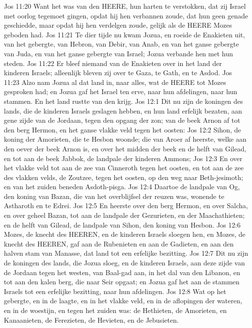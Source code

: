 Jos 11:20  Want het was van den HEERE, hun harten te verstokken, dat zij Israel met oorlog tegemoet gingen, opdat hij hen verbannen zoude, dat hun geen genade geschiedde, maar opdat hij hen verdelgen zoude, gelijk als de HEERE Mozes geboden had.
Jos 11:21  Te dier tijde nu kwam Jozua, en roeide de Enakieten uit, van het gebergte, van Hebron, van Debir, van Anab, en van het ganse gebergte van Juda, en van het ganse gebergte van Israel; Jozua verbande hen met hun steden.
Jos 11:22  Er bleef niemand van de Enakieten over in het land der kinderen Israels; alleenlijk bleven zij over te Gaza, te Gath, en te Asdod.
Jos 11:23  Alzo nam Jozua al dat land in, naar alles, wat de HEERE tot Mozes gesproken had; en Jozua gaf het Israel ten erve, naar hun afdelingen, naar hun stammen. En het land rustte van den krijg.
Jos 12:1  Dit nu zijn de koningen des lands, die de kinderen Israels geslagen hebben, en hun land erfelijk bezaten, aan gene zijde van de Jordaan, tegen den opgang der zon; van de beek Arnon af tot den berg Hermon, en het ganse vlakke veld tegen het oosten:
Jos 12:2  Sihon, de koning der Amorieten, die te Hesbon woonde; die van Aroer af heerste, welke aan den oever der beek Arnon is, en over het midden der beek en de helft van Gilead, en tot aan de beek Jabbok, de landpale der kinderen Ammons;
Jos 12:3  En over het vlakke veld tot aan de zee van Cinneroth tegen het oosten, en tot aan de zee des vlakken velds, de Zoutzee, tegen het oosten, op den weg naar Beth-jesimoth; en van het zuiden beneden Asdoth-pisga.
Jos 12:4  Daartoe de landpale van Og, den koning van Bazan, die van het overblijfsel der reuzen was, wonende te Astharoth en te Edrei.
Jos 12:5  En heerste over den berg Hermon, en over Salcha, en over geheel Bazan, tot aan de landpale der Gezurieten, en der Maachathieten; en de helft van Gilead, de landpale van Sihon, den koning van Hesbon.
Jos 12:6  Mozes, de knecht des HEEREN, en de kinderen Israels sloegen hen, en Mozes, de knecht des HEEREN, gaf aan de Rubenieten en aan de Gadieten, en aan den halven stam van Manasse, dat land tot een erfelijke bezitting.
Jos 12:7  Dit nu zijn de koningen des lands, die Jozua sloeg, en de kinderen Israels, aan deze zijde van de Jordaan tegen het westen, van Baal-gad aan, in het dal van den Libanon, en tot aan den kalen berg, die naar Seir opgaat; en Jozua gaf het aan de stammen Israels tot een erfelijke bezitting, naar hun afdelingen.
Jos 12:8  Wat op het gebergte, en in de laagte, en in het vlakke veld, en in de aflopingen der wateren, en in de woestijn, en tegen het zuiden was: de Hethieten, de Amorieten, en Kanaanieten, de Ferezieten, de Hevieten, en de Jebusieten.

